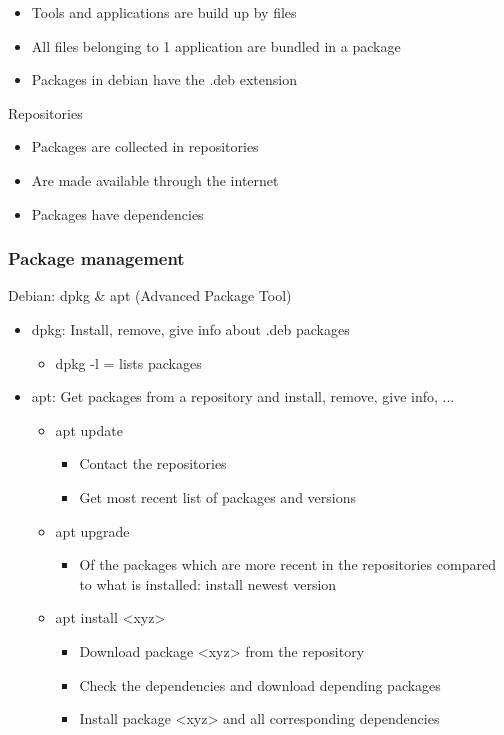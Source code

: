 \documentclass{article}
\begin{document}
\begin{itemize}
    \item Tools and applications are build up by files
    \item All files belonging to 1 application are bundled in a package
    \item Packages in debian have the .deb extension
\end{itemize}

Repositories

\begin{itemize}
    \item Packages are collected in repositories
    \item Are made available through the internet
    \item Packages have dependencies
\end{itemize}

\subsubsection{Package management}

Debian: dpkg \& apt (Advanced Package Tool)

\begin{itemize}
    \item dpkg: Install, remove, give info about .deb packages
    \begin{itemize}
        \item dpkg -l = lists packages 
    \end{itemize}
    \item apt: Get packages from a repository and install, remove, give info, ...
    \begin{itemize}
        \item apt update
        \begin{itemize}
            \item Contact the repositories
            \item Get most recent list of packages and versions
        \end{itemize}
        \item apt upgrade
        \begin{itemize}
            \item Of the packages which are more recent in the repositories compared to what is installed: install newest version
        \end{itemize}
        \item apt install <xyz>
        \begin{itemize}
            \item Download package <xyz> from the repository
            \item Check the dependencies and download depending packages
            \item Install package <xyz> and all corresponding dependencies
        \end{itemize}
    \end{itemize}
\end{itemize}
\end{document}
